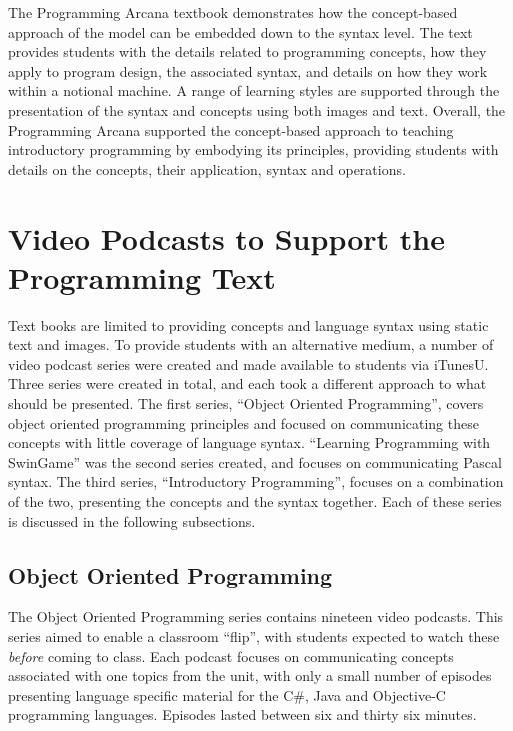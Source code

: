 The Programming Arcana textbook demonstrates how the concept-based approach of the model can be embedded down to the syntax level. The text provides students with the details related to programming concepts, how they apply to program design, the associated syntax, and details on how they work within a notional machine. A range of learning styles are supported through the presentation of the syntax and concepts using both images and text. Overall, the Programming Arcana supported the concept-based approach to teaching introductory programming by embodying its principles, providing students with details on the concepts, their application, syntax and operations. 




\section{Video Podcasts to Support the Programming Text} %
\label{sec:vodcasts}

Text books are limited to providing concepts and language syntax using static text and images. To provide students with an alternative medium, a number of video podcast series were created and made available to students via iTunesU. Three series were created in total, and each took a different approach to what should be presented. The first series, ``Object Oriented Programming'', covers object oriented programming principles and focused on communicating these concepts with little coverage of language syntax. ``Learning Programming with SwinGame'' was the second series created, and focuses on communicating Pascal syntax. The third series, ``Introductory Programming'', focuses on a combination of the two, presenting the concepts and the syntax together. Each of these series is discussed in the following subsections.

\subsection{Object Oriented Programming} %
\label{sub:object_oriented_programming}

The Object Oriented Programming series contains nineteen video podcasts. This series aimed to enable a classroom ``flip'', with students expected to watch these \emph{before} coming to class. Each podcast focuses on communicating concepts associated with one topics from the unit, with only a small number of episodes presenting language specific material for the C\#, Java and Objective-C programming languages. Episodes lasted between six and thirty six minutes.

